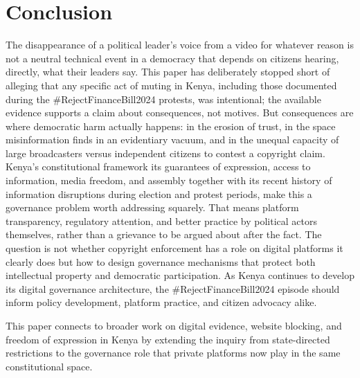 \documentclass{article}
\begin{document}
\section{Conclusion}
The disappearance of a political leader’s voice from a video for whatever reason is not a neutral technical event in a democracy that depends on citizens hearing, directly, what their leaders say. This paper has deliberately stopped short of alleging that any specific act of muting in Kenya, including those documented during the \#RejectFinanceBill2024 protests, was intentional; the available evidence supports a claim about consequences, not motives. But consequences are where democratic harm actually happens: in the erosion of trust, in the space misinformation finds in an evidentiary vacuum, and in the unequal capacity of large broadcasters versus independent citizens to contest a copyright claim.
Kenya’s constitutional framework its guarantees of expression, access to information, media freedom, and assembly together with its recent history of information disruptions during election and protest periods, make this a governance problem worth addressing squarely. That means platform transparency, regulatory attention, and better practice by political actors themselves, rather than a grievance to be argued about after the fact. The question is not whether copyright enforcement has a role on digital platforms it clearly does but how to design governance mechanisms that protect both intellectual property and democratic participation. As Kenya continues to develop its digital governance architecture, the \#RejectFinanceBill2024 episode should inform policy development, platform practice, and citizen advocacy alike.
\par
This paper connects to broader work on digital evidence, website blocking, and freedom of expression in Kenya by extending the inquiry from state-directed restrictions to the governance role that private platforms now play in the same constitutional space.




\end{document}
